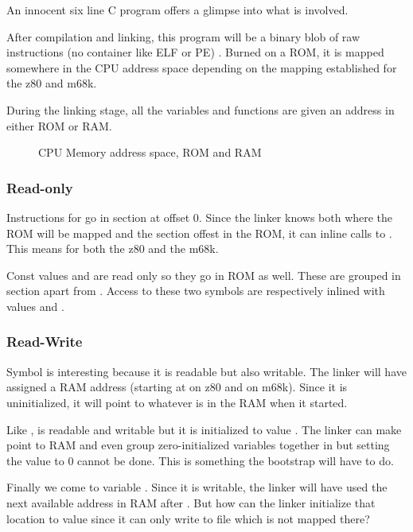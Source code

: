 An innocent six line C program offers a glimpse into what is involved.



After compilation and linking, this program will be a binary blob of raw instructions (no container like ELF or PE) . Burned on a ROM, it is mapped somewhere in the CPU address space depending on the mapping established for the z80 and m68k.

During the linking stage, all the variables and functions are given an address in either ROM or RAM. 

\begin{figure}[H]
\caption*{CPU Memory address space, ROM and RAM}
\end{figure}

\subsubsection{Read-only}
Instructions for  go in section  at offset 0. Since the linker knows both where the ROM will be mapped and the section offest in the ROM, it can inline calls to . This means  for both the z80 and the m68k.

Const values  and  are read only so they go in ROM as well. These are grouped in section  apart from . Access to these two symbols are respectively inlined with values  and .



\subsubsection{Read-Write}
Symbol  is interesting because it is readable but also writable. The linker will have assigned a RAM address (starting at  on z80 and  on m68k). Since it is uninitialized, it will point to whatever is in the RAM when it started.

Like ,  is readable and writable but it is initialized to value . The linker can make  point to RAM and even group zero-initialized variables together in  but setting the value to 0 cannot be done. This is something the bootstrap will have to do.

Finally we come to variable . Since it is writable, the linker will have used the next available address in RAM after . But how can the linker initialize that location to value  since it can only write to file  which is not mapped there? 

